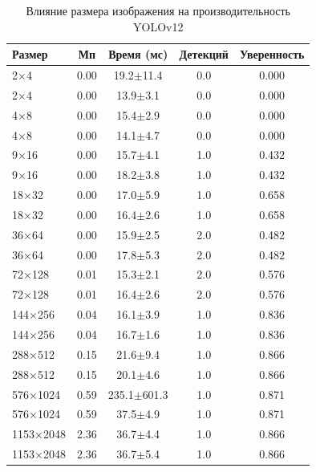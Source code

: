 \begin{table}[H]
\centering
\caption{Влияние размера изображения на производительность YOLOv12}
\label{tab:size_research}
\begin{tabular}{|l|c|c|c|c|}
\hline
\textbf{Размер} & \textbf{Мп} & \textbf{Время (мс)} & \textbf{Детекций} & \textbf{Уверенность} \\
\hline
2×4 & 0.00 & 19.2$\pm$11.4 & 0.0 & 0.000 \\
\hline
2×4 & 0.00 & 13.9$\pm$3.1 & 0.0 & 0.000 \\
\hline
4×8 & 0.00 & 15.4$\pm$2.9 & 0.0 & 0.000 \\
\hline
4×8 & 0.00 & 14.1$\pm$4.7 & 0.0 & 0.000 \\
\hline
9×16 & 0.00 & 15.7$\pm$4.1 & 1.0 & 0.432 \\
\hline
9×16 & 0.00 & 18.2$\pm$3.8 & 1.0 & 0.432 \\
\hline
18×32 & 0.00 & 17.0$\pm$5.9 & 1.0 & 0.658 \\
\hline
18×32 & 0.00 & 16.4$\pm$2.6 & 1.0 & 0.658 \\
\hline
36×64 & 0.00 & 15.9$\pm$2.5 & 2.0 & 0.482 \\
\hline
36×64 & 0.00 & 17.8$\pm$5.3 & 2.0 & 0.482 \\
\hline
72×128 & 0.01 & 15.3$\pm$2.1 & 2.0 & 0.576 \\
\hline
72×128 & 0.01 & 16.4$\pm$2.6 & 2.0 & 0.576 \\
\hline
144×256 & 0.04 & 16.1$\pm$3.9 & 1.0 & 0.836 \\
\hline
144×256 & 0.04 & 16.7$\pm$1.6 & 1.0 & 0.836 \\
\hline
288×512 & 0.15 & 21.6$\pm$9.4 & 1.0 & 0.866 \\
\hline
288×512 & 0.15 & 20.1$\pm$4.6 & 1.0 & 0.866 \\
\hline
576×1024 & 0.59 & 235.1$\pm$601.3 & 1.0 & 0.871 \\
\hline
576×1024 & 0.59 & 37.5$\pm$4.9 & 1.0 & 0.871 \\
\hline
1153×2048 & 2.36 & 36.7$\pm$4.4 & 1.0 & 0.866 \\
\hline
1153×2048 & 2.36 & 36.7$\pm$5.4 & 1.0 & 0.866 \\
\hline
\end{tabular}
\end{table}
